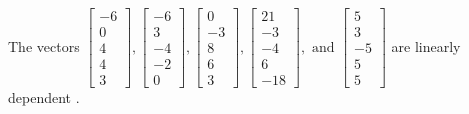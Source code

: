 \begin{exercise}
\begin{exerciseStatement}
  \end{exerciseStatement}
  \begin{exerciseAnswer}
   The vectors \(\left[\begin{array}{r}
-6 \\
0 \\
4 \\
4 \\
3
\end{array}\right] , \left[\begin{array}{r}
-6 \\
3 \\
-4 \\
-2 \\
0
\end{array}\right] , \left[\begin{array}{r}
0 \\
-3 \\
8 \\
6 \\
3
\end{array}\right] , \left[\begin{array}{r}
21 \\
-3 \\
-4 \\
6 \\
-18
\end{array}\right] , \text{ and } \left[\begin{array}{r}
5 \\
3 \\
-5 \\
5 \\
5
\end{array}\right]\) are 
  	 linearly dependent  .
  


  \end{exerciseAnswer}
\end{exercise}